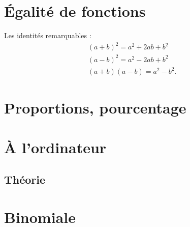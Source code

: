 \section{Égalité de fonctions}

Les identités remarquables :
\begin{subequations}
    \begin{align}
        (a+b)^2=a^2+2ab+b^2\\
        (a-b)^2=a^2-2ab+b^2\\
        (a+b)(a-b)=a^2-b^2.
    \end{align}
\end{subequations}


\section{Proportions, pourcentage}



\section{À l'ordinateur}



\subsection{Théorie}


\section{Binomiale}


